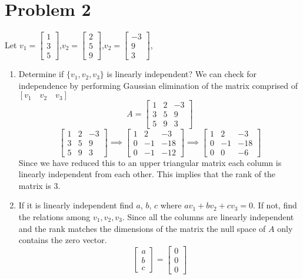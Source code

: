 \documentclass{article}
\begin{document}
\section*{Problem 2}
Let $v_1=\begin{bmatrix} 1 \\ 3 \\ 5 \end{bmatrix}$,$v_2=\begin{bmatrix} 2 \\ 5 \\ 9 \end{bmatrix}$,$v_2=\begin{bmatrix} -3 \\ 9 \\ 3 \end{bmatrix}$,
\begin{enumerate}[1)]
\item Determine if $\{v_1,v_2,v_3\}$ is linearly independent?
\newline
We can check for independence by performing Gaussian elimination of the matrix comprised of $[v_1 \quad v_2 \quad v_3]$
$$
A =
\begin{bmatrix}
1 & 2 & -3 \\
3 & 5 & 9  \\
5 & 9 & 3
\end{bmatrix}
$$
$$
\begin{bmatrix}
1 & 2 & -3 \\
3 & 5 & 9  \\
5 & 9 & 3
\end{bmatrix}
\implies
\begin{bmatrix}
1 & 2  & -3  \\
0 & -1 & -18 \\
0 & -1 & -12
\end{bmatrix}
\implies
\begin{bmatrix}
1 & 2  & -3  \\
0 & -1 & -18 \\
0 & 0  & -6
\end{bmatrix}
$$
Since we have reduced this to an upper triangular matrix each column is linearly independent from each other.
This implies that the rank of the matrix is $3$.
\item If it is linearly independent find $a$, $b$, $c$ where $av_1 + bv_2 + cv_3 = 0$.
If not, find the relations among $v_1,v_2,v_3$.
\newline
Since all the columns are linearly independent and the rank matches the dimensions of the matrix the null space of $A$ only contains the zero vector.
$$
\begin{bmatrix}a\\b\\c\end{bmatrix}
=
\begin{bmatrix}0\\0\\0\end{bmatrix}
$$
\end{enumerate}
\end{document}
